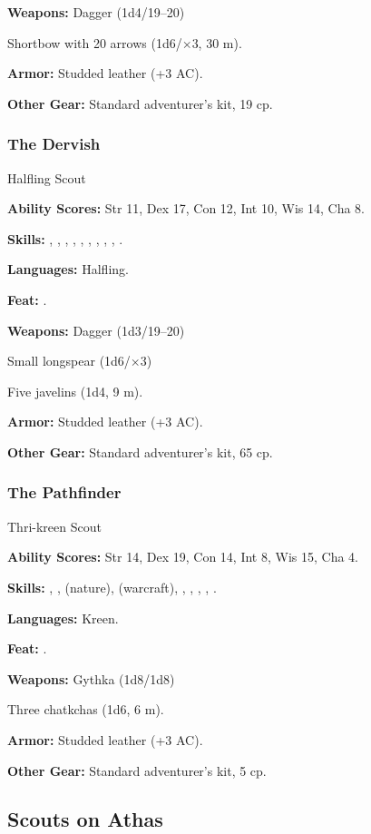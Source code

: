 \textbf{Weapons:} Dagger (1d4/19--20)

Shortbow with 20 arrows (1d6/$\times$3, 30 m).

\textbf{Armor:} Studded leather (+3 AC).

\textbf{Other Gear:} Standard adventurer's kit, 19 cp.

\subsubsection{The Dervish}
Halfling Scout

\textbf{Ability Scores:} Str 11, Dex 17, Con 12, Int 10, Wis 14, Cha 8.

\textbf{Skills:} , , , , , , , , , .

\textbf{Languages:} Halfling.

\textbf{Feat:} .

\textbf{Weapons:} Dagger (1d3/19--20)

Small longspear (1d6/$\times$3)

Five javelins (1d4, 9 m).

\textbf{Armor:} Studded leather (+3 AC).

\textbf{Other Gear:} Standard adventurer's kit, 65 cp.

\subsubsection{The Pathfinder}
Thri-kreen Scout

\textbf{Ability Scores:} Str 14, Dex 19, Con 14, Int 8, Wis 15, Cha 4.

\textbf{Skills:} , ,  (nature),  (warcraft), , , , , .

\textbf{Languages:} Kreen.

\textbf{Feat:} .

\textbf{Weapons:} Gythka (1d8/1d8)

Three chatkchas (1d6, 6 m).

\textbf{Armor:} Studded leather (+3 AC).

\textbf{Other Gear:} Standard adventurer's kit, 5 cp.

\subsection{Scouts on Athas}

